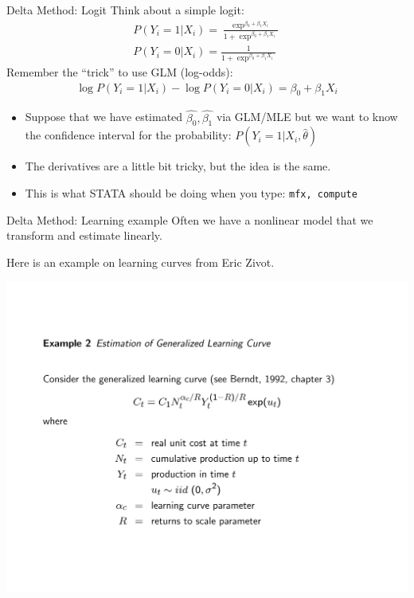 \begin{frame}{Delta Method: Logit}
  Think about a simple logit:
  \begin{eqnarray*}
  P(Y_i=1 | X_i ) = \frac{\exp^{\beta_0 + \beta_1 X_i}}{1+\exp^{\beta_0 + \beta_1 X_i}} \\
  P(Y_i=0 | X_i ) = \frac{1}{1+\exp^{\beta_0 + \beta_1 X_i}} 
  \end{eqnarray*}
  Remember the ``trick'' to use GLM (log-odds):
  \begin{eqnarray*}
  \log P(Y_i=1 | X_i) - \log P(Y_i=0 | X_i) = \beta_0 + \beta_1 X_i
  \end{eqnarray*}
  \vspace{-10pt}
  \begin{itemize}
  \item Suppose that we have estimated $\hat{\beta_0},\hat{\beta_1}$ via GLM/MLE but we want to know the confidence interval for the probability: $P(Y_i=1 | X_i,\hat{\theta})$
  \item The derivatives are a little bit tricky, but the idea is the same.
  \item This is what STATA should be doing when you type: \tt{mfx, compute}
  \end{itemize}
\end{frame}


\begin{frame}{Delta Method: Learning example}
  Often we have a nonlinear model that we transform and estimate linearly.
   
  Here is an example on learning curves from Eric Zivot. 
  \vspace{-15pt}

  \includegraphics[page=1,trim={2cm 2cm 2cm 2cm},clip,width=\textwidth]{./resources/zivotLearning.pdf}

\end{frame}

